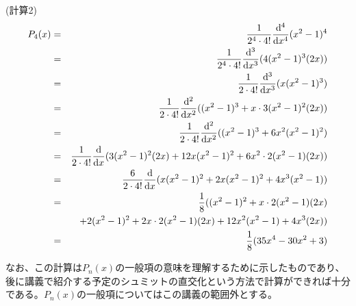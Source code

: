 \documentclass[a4j,12pt]{jarticle}
\begin{document}
(計算2)
\begin{eqnarray*}
P_4(x) &=& \frac{1}{2^4 \cdot 4!} \frac{{\rm d}^4}{{\rm d}x^4} (x^2 -1)^4\\
       &=& \frac{1}{2^4 \cdot 4!} \frac{{\rm d}^3}{{\rm d}x^3} (4(x^2 -1)^3(2x))\\
       &=& \frac{1}{2 \cdot 4!} \frac{{\rm d}^3}{{\rm d}x^3} (x(x^2 -1)^3)\\
       &=& \frac{1}{2 \cdot 4!} \frac{{\rm d}^2}{{\rm d}x^2} ((x^2 -1)^3 + x \cdot 3(x^2-1)^2(2x))\\
       &=& \frac{1}{2 \cdot 4!} \frac{{\rm d}^2}{{\rm d}x^2} ((x^2 -1)^3 + 6x^2 (x^2-1)^2)\\
       &=& \frac{1}{2 \cdot 4!} \frac{{\rm d}}{{\rm d}x} (3(x^2-1)^2(2x) + 12x(x^2-1)^2 + 6x^2 \cdot 2(x^2-1)(2x))\\
       &=& \frac{6}{2 \cdot 4!} \frac{{\rm d}}{{\rm d}x} 
               (x(x^2-1)^2 + 2x(x^2-1)^2 + 4 x^3 (x^2-1))\\
       &=& \frac{1}{8}
               ((x^2-1)^2 + x \cdot 2(x^2-1)(2x)\\
       &&         + 2(x^2-1)^2 + 2x \cdot 2 (x^2-1)(2x)
                + 12x^2 (x^2-1) + 4x^3 (2x))\\
       &=& \frac{1}{8}
               (35x^4 - 30x^2 + 3)\\
\end{eqnarray*}

なお、この計算は$P_n(x)$の一般項の意味を理解するために示したものであり、
後に講義で紹介する予定のシュミットの直交化という方法で計算ができれば十分
である。$P_n(x)$の一般項についてはこの講義の範囲外とする。
\end{document}
